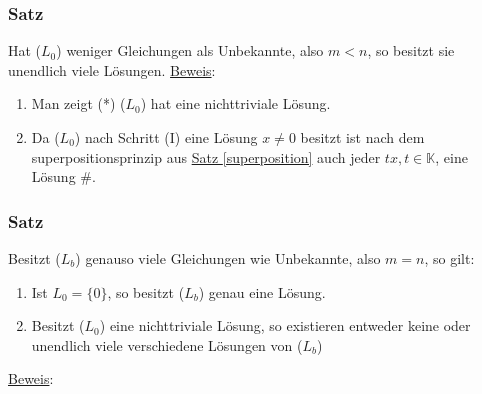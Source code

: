 \subsubsection{Satz}
\label{1.4.8}
Hat (\hyperref[L0]{$L_0$}) weniger Gleichungen als Unbekannte, also $m<n$, so besitzt sie unendlich viele Lösungen.
\underline{Beweis}:
\renewcommand{\labelenumi}{\Roman{enumi}.}
\begin{enumerate}
\item Man zeigt (*) (\hyperref[L0]{$L_0$}) hat eine nichttriviale Lösung.
\item Da (\hyperref[L0]{$L_0$}) nach Schritt (I) eine Lösung $x\not= 0$ besitzt ist nach dem superpositionsprinzip aus \hyperref[superposition]{Satz \ref*{superposition}} auch jeder $tx,t\in \mathbb{K}$, eine Lösung \#.
\end{enumerate}
\subsubsection{Satz}
\label{1.4.9}
Besitzt (\hyperref[Lb]{$L_b$}) genauso viele Gleichungen wie Unbekannte, also $m=n$, so gilt:
\renewcommand{\labelenumi}{(\alph{enumi})}
\begin{enumerate}
\item Ist $L_0=\{0\}$, so besitzt (\hyperref[Lb]{$L_b$}) genau eine Lösung.
\item Besitzt (\hyperref[L0]{$L_0$}) eine nichttriviale Lösung, so existieren entweder keine oder unendlich viele verschiedene Lösungen von (\hyperref[Lb]{$L_b$})
\end{enumerate}
\underline{Beweis}:
